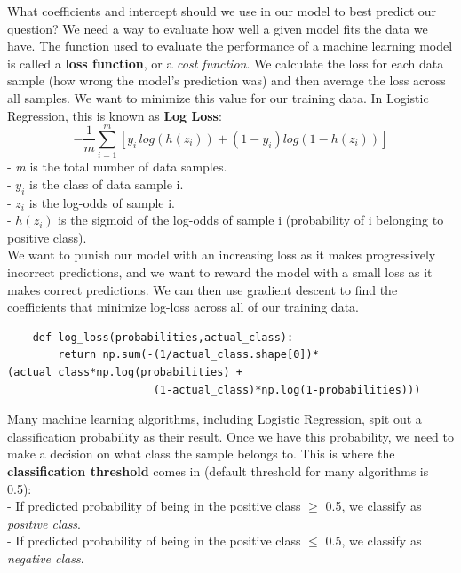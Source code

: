 \documentclass[11pt, a4paper]{article}
\begin{document}
\begin{spacing}{1.1}
	\noindent What coefficients and intercept should we use in our model to best predict our question? We need a way to evaluate how well a given model fits the data we have. The function used to evaluate the performance of a machine learning model is called a \textbf{loss function}, or a \textit{cost function}. We calculate the loss for each data sample (how wrong the model’s prediction was) and then average the loss across all samples. We want to minimize this value for our training data. In Logistic Regression, this is known as \textbf{Log Loss}: $$ -\frac{1}{m} \sum_{i=1}^{m}[y_i\,  log(h(z_i)) + (1-y_i)log(1-h(z_i))] $$
	\hspace*{3mm} - \textit{m} is the total number of data samples. \\
	\hspace*{3mm} - $y_i$ is the class of data sample i. \\
	\hspace*{3mm} - $z_i$ is the log-odds of sample i. \\
	\hspace*{3mm} - $h(z_i)$ is the sigmoid of the log-odds of sample i (probability of i belonging to positive class). \vspace*{1mm} \\
	We want to punish our model with an increasing loss as it makes progressively incorrect predictions, and we want to reward the model with a small loss as it makes correct predictions. We can then use gradient descent to find the coefficients that minimize log-loss across all of our training data.
	\begin{lstlisting}
	def log_loss(probabilities,actual_class):
		return np.sum(-(1/actual_class.shape[0])*(actual_class*np.log(probabilities) + 
		               (1-actual_class)*np.log(1-probabilities))) \end{lstlisting} \vspace*{1mm}
	Many machine learning algorithms, including Logistic Regression, spit out a classification probability as their result. Once we have this probability, we need to make a decision on what class the sample belongs to. This is where the \textbf{classification threshold} comes in (default threshold for many algorithms is 0.5): \\
	\hspace*{3mm} - If predicted probability of being in the positive class $\geq$ 0.5, we classify as \textit{positive class}. \\
	\hspace*{3mm} - If predicted probability of being in the positive class $\leq$ 0.5, we classify as \textit{negative class}. \vspace*{1mm} \\

\end{spacing}
\end{document}
